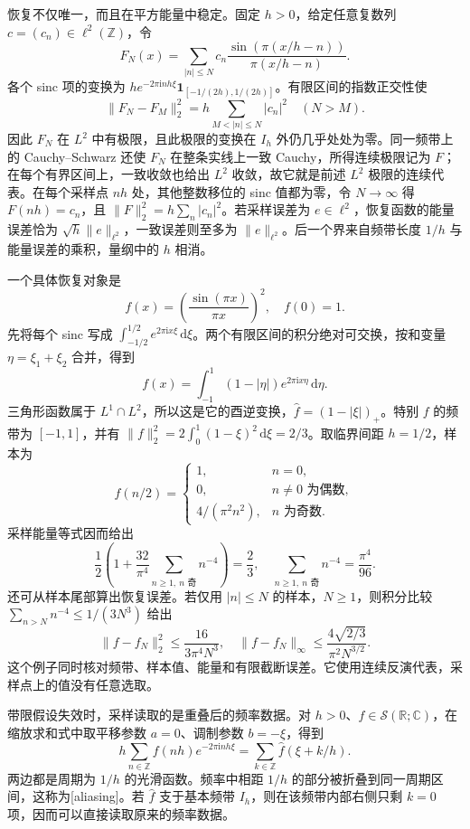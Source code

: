 \ProseParagraphBreak

恢复不仅唯一，而且在平方能量中稳定。固定 \(h>0\)，给定任意复数列 \(c=(c_n)\in\ell^2(\mathbb Z)\)，令
\[
 F_N(x)=\sum_{|n|\leq N}c_n\frac{\sin(\pi(x/h-n))}{\pi(x/h-n)}.
\]
各个 sinc 项的变换为 \(h e^{-2\pi\mathrm{i}nh\xi}\mathbf1_{[-1/(2h),1/(2h)]}\)。有限区间的指数正交性使
\[
 \|F_N-F_M\|_2^2=h\sum_{M<|n|\leq N}|c_n|^2\quad(N>M).
\]
因此 \(F_N\) 在 \(L^2\) 中有极限，且此极限的变换在 \(I_h\) 外仍几乎处处为零。同一频带上的 Cauchy--Schwarz 还使 \(F_N\) 在整条实线上一致 Cauchy，所得连续极限记为 \(F\)；在每个有界区间上，一致收敛也给出 \(L^2\) 收敛，故它就是前述 \(L^2\) 极限的连续代表。在每个采样点 \(nh\) 处，其他整数移位的 sinc 值都为零，令 \(N\to\infty\) 得 \(F(nh)=c_n\)，且 \(\|F\|_2^2=h\sum_n|c_n|^2\)。若采样误差为 \(e\in\ell^2\)，恢复函数的能量误差恰为 \(\sqrt h\|e\|_{\ell^2}\)，一致误差则至多为 \(\|e\|_{\ell^2}\)。后一个界来自频带长度 \(1/h\) 与能量误差的乘积，量纲中的 \(h\) 相消。

\ProseParagraphBreak

一个具体恢复对象是
\[
 f(x)=\left(\frac{\sin(\pi x)}{\pi x}\right)^2,
 \quad f(0)=1.
\]
先将每个 sinc 写成 \(\int_{-1/2}^{1/2}e^{2\pi\mathrm{i}x\xi}\,\mathrm{d}\xi\)。两个有限区间的积分绝对可交换，按和变量 \(\eta=\xi_1+\xi_2\) 合并，得到
\[
 f(x)=\int_{-1}^1(1-|\eta|)e^{2\pi\mathrm{i}x\eta}\,\mathrm{d}\eta.
\]
三角形函数属于 \(L^1\cap L^2\)，所以这是它的酉逆变换，\(\widehat f=(1-|\xi|)_+\)。特别 \(f\) 的频带为 \([-1,1]\)，并有 \(\|f\|_2^2=2\int_0^1(1-\xi)^2\,\mathrm{d}\xi=2/3\)。取临界间距 \(h=1/2\)，样本为
\[
 f(n/2)=
 \begin{cases}
 1,&n=0,\\
 0,&n\ne0\text{ 为偶数},\\
 4/(\pi^2n^2),&n\text{ 为奇数}.
 \end{cases}
\]
采样能量等式因而给出
\[
 \frac12\left(1+\frac{32}{\pi^4}\sum_{n\geq1,\ n\text{ 奇}}n^{-4}\right)=\frac23,
 \quad\sum_{n\geq1,\ n\text{ 奇}}n^{-4}=\frac{\pi^4}{96}.
\]
还可从样本尾部算出恢复误差。若仅用 \(|n|\leq N\) 的样本，\(N\geq1\)，则积分比较 \(\sum_{n>N}n^{-4}\leq1/(3N^3)\) 给出
\[
 \|f-f_N\|_2^2\leq\frac{16}{3\pi^4N^3},
 \quad\|f-f_N\|_\infty\leq\frac{4\sqrt{2/3}}{\pi^2N^{3/2}}.
\]
这个例子同时核对频带、样本值、能量和有限截断误差。它使用连续反演代表，采样点上的值没有任意选取。

\ProseParagraphBreak

带限假设失效时，采样读取的是重叠后的频率数据。对 \(h>0\)、\(f\in\mathcal S(\mathbb R;\mathbb C)\)，在缩放求和式中取平移参数 \(a=0\)、调制参数 \(b=-\xi\)，得到
\begin{equation}\label{b2:eq:06-aliasing}
 h\sum_{n\in\mathbb Z}f(nh)e^{-2\pi\mathrm{i}nh\xi}
 =\sum_{k\in\mathbb Z}\widehat f(\xi+k/h).
\end{equation}
两边都是周期为 \(1/h\) 的光滑函数。频率中相距 \(1/h\) 的部分被折叠到同一周期区间，这称为[aliasing]。若 \(\widehat f\) 支于基本频带 \(I_h\)，则在该频带内部右侧只剩 \(k=0\) 项，因而可以直接读取原来的频率数据。

